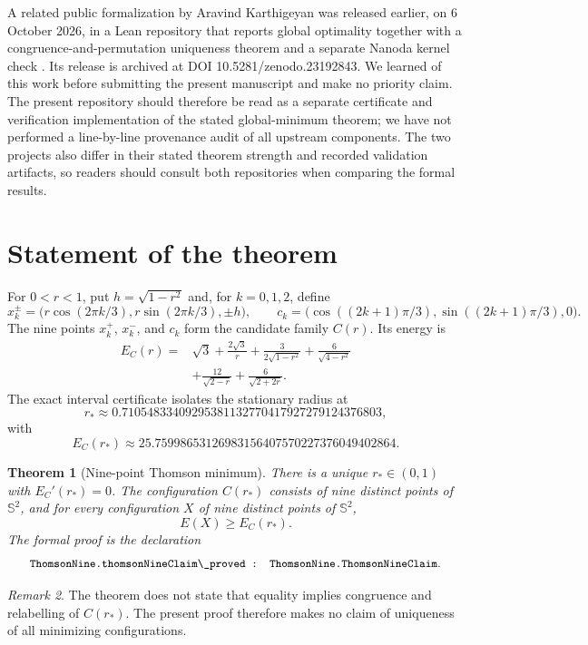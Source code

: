 \documentclass[11pt]{article}
\newtheorem{theorem}{Theorem}[section]
\theoremstyle{definition}
\theoremstyle{remark}
\newtheorem{remark}[theorem]{Remark}
\newcommand{\Sphere}{\mathbb{S}^2}
\newcommand{\code}[1]{\texttt{\small\detokenize{#1}}}
\begin{document}
A related public formalization by Aravind Karthigeyan was released earlier, on 6 October 2026, in a Lean repository that reports global optimality together with a congruence-and-permutation uniqueness theorem and a separate Nanoda kernel check \cite{Karthigeyan2026}.  Its release is archived at DOI 10.5281/zenodo.23192843.  We learned of this work before submitting the present manuscript and make no priority claim.  The present repository should therefore be read as a separate certificate and verification implementation of the stated global-minimum theorem; we have not performed a line-by-line provenance audit of all upstream components.  The two projects also differ in their stated theorem strength and recorded validation artifacts, so readers should consult both repositories when comparing the formal results.

\section{Statement of the theorem}

For $0<r<1$, put $h=\sqrt{1-r^2}$ and, for $k=0,1,2$, define
\[
 x_k^{\pm}=\bigl(r\cos(2\pi k/3),r\sin(2\pi k/3),\pm h\bigr),\qquad
 c_k=\bigl(\cos((2k+1)\pi/3),\sin((2k+1)\pi/3),0\bigr).
\]
The nine points $x_k^+$, $x_k^-$, and $c_k$ form the candidate family $C(r)$.  Its energy is
\begin{align*}
 E_C(r)={}&\sqrt3+\frac{2\sqrt3}{r}+\frac{3}{2\sqrt{1-r^2}}
 +\frac{6}{\sqrt{4-r^2}}\\
 &+\frac{12}{\sqrt{2-r}}+\frac{6}{\sqrt{2+2r}}.
\end{align*}
The exact interval certificate isolates the stationary radius at
\[
 r_*\approx0.71054833409295381132770417927279124376803,
\]
with
\[
 E_C(r_*)\approx25.75998653126983156407570227376049402864.
\]

\begin{theorem}[Nine-point Thomson minimum]
There is a unique $r_*\in(0,1)$ with $E_C'(r_*)=0$.  The configuration $C(r_*)$ consists of nine distinct points of $\Sphere$, and for every configuration $X$ of nine distinct points of $\Sphere$,
\[
 E(X)\geq E_C(r_*).
\]
The formal proof is the declaration
\[
\code{ThomsonNine.thomsonNineClaim\_proved : ThomsonNine.ThomsonNineClaim}.
\]
\end{theorem}

\begin{remark}
The theorem does not state that equality implies congruence and relabelling of $C(r_*)$.  The present proof therefore makes no claim of uniqueness of all minimizing configurations.
\end{remark}
\end{document}
